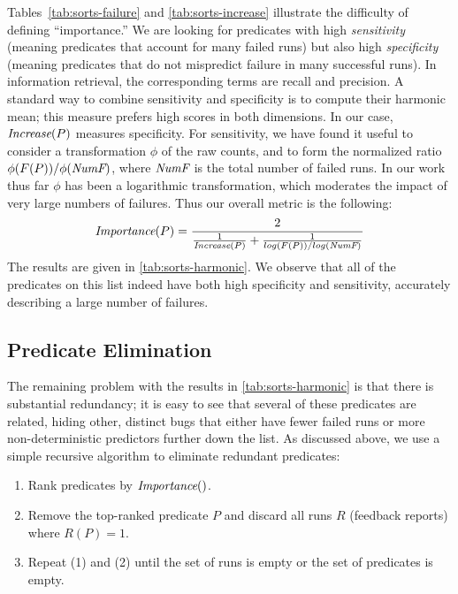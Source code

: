 Tables~\ref{tab:sorts-failure} and \ref{tab:sorts-increase} illustrate the difficulty of defining
``importance.''  We are looking for predicates with high \emph{sensitivity}
(meaning predicates that account for many failed runs) but also high \emph{specificity} (meaning predicates that do not mispredict failure in many successful
runs).  In information retrieval, the corresponding terms are recall and
precision.  A standard way to combine sensitivity and specificity is to compute
their harmonic mean; this measure prefers high scores in
both dimensions.  In our case, $\textit{Increase}(P)$ measures specificity.  For
sensitivity, we have found it useful to consider a transformation $\phi$ 
of the raw counts, and to form the normalized ratio $\phi(F(P)) / \phi(\textit{NumF})$, 
where $\textit{NumF}$ is the total number of failed runs.
In our work thus far $\phi$ has been a logarithmic
transformation, which moderates the impact of very large numbers of failures.
Thus our overall metric is the following:
\[
\textit{Importance}(P) =
\frac{2}{
  \frac{1}{\textit{Increase}(P)}
  +
  \frac{1}{log(F(P)) / log(\textit{NumF})}}
\]
The results are given in \autoref{tab:sorts-harmonic}.  We observe that
all of the predicates on this list indeed have both high specificity and
sensitivity, accurately describing a large number of failures. 


\subsection{Predicate Elimination}
\label{sec:elimination}

The remaining problem with the results in \autoref{tab:sorts-harmonic}
is that there is substantial redundancy; it is easy to see that several of these
predicates are related, hiding other, distinct bugs that either have
fewer failed runs or more non-deterministic predictors further down the
list.  As discussed above, we use a simple recursive algorithm to eliminate
redundant predicates:
\begin{enumerate}

\item Rank predicates by $\textit{Importance}()$.

\item Remove the top-ranked predicate $P$ and discard all runs $R$ (feedback reports) where  $R(P) = 1$.

\item Repeat (1) and (2) until the set of runs is empty or the set of predicates is empty.
\end{enumerate}

